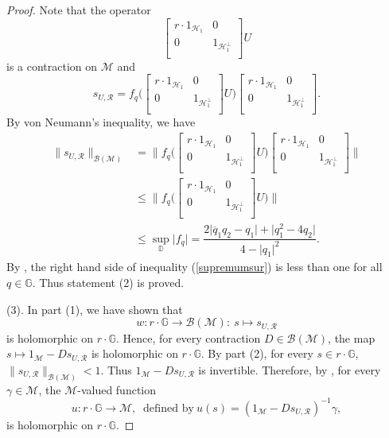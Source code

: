 \documentclass[12pt,reqno]{amsart}
\numberwithin{equation}{section}
\theoremstyle{definition}
\begin{document}
\begin{proof}
Note that  the operator  
$$\begin{bmatrix}
	r\cdot 1_{\mathcal{H}_{1}} & 0 \\
	0 & 1_{\mathcal{H}^{\perp}_{1}} \\
\end{bmatrix}U$$
is a contraction on $\mathcal{M}$ and 
$$ s_{U,\mathcal{R}} = f_{q}\bigg( \begin{bmatrix}
	r\cdot 1_{\mathcal{H}_{1}} & 0 \\
	0 & 1_{\mathcal{H}^{\perp}_{1}} \\
\end{bmatrix}U\Bigg) \begin{bmatrix}
	r\cdot 1_{\mathcal{H}_{1}} & 0 \\
	0 & 1_{\mathcal{H}^{\perp}_{1}} \\
\end{bmatrix}.
$$
By von Neumann's inequality,  we have
\begin{align}
\| s_{U,\mathcal{R}} \|_{\mathcal{B(M)}} &= \Bigg\| f_{q}\bigg( \begin{bmatrix}
	r\cdot 1_{\mathcal{H}_{1}} & 0 \\
	0 & 1_{\mathcal{H}^{\perp}_{1}} \\
\end{bmatrix}U\Bigg) \begin{bmatrix}
	r\cdot 1_{\mathcal{H}_{1}} & 0 \\
	0 & 1_{\mathcal{H}^{\perp}_{1}} \\
\end{bmatrix}\Bigg\| \nonumber\\
& \leq \Bigg\| f_{q}\bigg( \begin{bmatrix}
	r\cdot 1_{\mathcal{H}_{1}} & 0 \\
	0 & 1_{\mathcal{H}^{\perp}_{1}} \\
\end{bmatrix}U\Bigg)  \Bigg\| \nonumber\\
& \leq \sup_{\mathbb{D}} \lvert{f_{q}\rvert} = \dfrac{   2\lvert{\overline{q}_{1}q_{2} -q_{1}\rvert}+\lvert{q_{1}^{2}-4q_{2}\rvert}}{4-\lvert{q_{1}\rvert}^{2}}. \label{supremumsur}
\end{align}
By    \cite[Theorem 2.1]{HGSB}, the right hand side of inequality (\ref{supremumsur}) is less than one for all $ q\in\mathbb{G}$. Thus statement (2) is proved.

(3). In part (1), we have shown that $$w:r\cdot\mathbb{G}\rightarrow \mathcal{B}(\mathcal{M}): \ s \mapsto s_{U,\mathcal{R}}$$ is holomorphic on $r\cdot \mathbb{G}$. Hence,  for every contraction $D \in {\mathcal{B(M)}}$, the map  $s \mapsto 1_{\mathcal{M}}-Ds_{U,\mathcal{R}}$ is holomorphic on $r\cdot\mathbb{G}$. By part (2), for every $s \in r\cdot \mathbb{G}$, $\|s_{U,\mathcal{R}}\|_{\mathcal{B(M)}}< 1$. Thus $1_{\mathcal{M}}-Ds_{U,\mathcal{R}}$ is invertible. 
Therefore, by \cite[Proposition I.2.6]{completenormedalgebras}, for every $\gamma\in\mathcal{M}$, the $\mathcal{M}$-valued function $$u:r\cdot\mathbb{G}\rightarrow \mathcal{M}, \ \text{ defined by} \ u(s) = (1_{\mathcal{M}}-Ds_{U,\mathcal{R}})^{-1}\gamma,$$ is holomorphic on $r\cdot\mathbb{G}$.
\end{proof}
\end{document}
